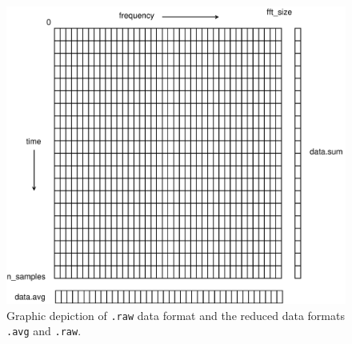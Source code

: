\documentclass[12pt]{article}
\begin{document}
\begin{figure}[htbp]
\centerline{\includegraphics[width=5in]{Array.pdf}}
\caption{Graphic depiction of {\tt .raw} data format and the reduced data formats {\tt .avg} and {\tt .raw}. }
 
\label{FIG:format}
\end{figure}
\end{document}
